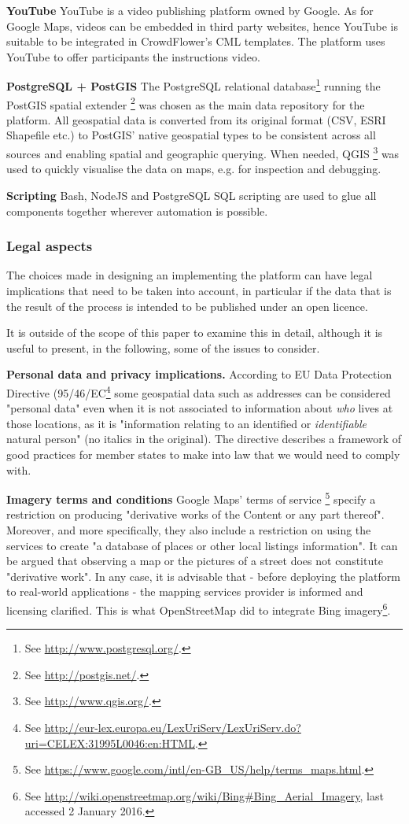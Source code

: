 \textbf{YouTube} YouTube is a video publishing platform owned by Google. As for Google Maps, videos can be embedded in third party websites, hence YouTube is suitable to be integrated in CrowdFlower's CML templates. The platform uses YouTube to offer participants the instructions video.  

\textbf{PostgreSQL + PostGIS} The PostgreSQL relational database\footnote{See \url{http://www.postgresql.org/}.} running the PostGIS spatial extender \footnote{See \url{http://postgis.net/}.} was chosen as the main data repository for the platform. All geospatial data is converted from its original format (CSV, ESRI Shapefile etc.) to PostGIS' native geospatial types to be consistent across all sources and enabling spatial and geographic querying. When needed, QGIS \footnote{See \url{http://www.qgis.org/}.} was used to quickly visualise the data on maps, e.g. for inspection and debugging.

\textbf{Scripting} Bash, NodeJS and PostgreSQL SQL scripting are used to glue all components together wherever automation is possible.  

\subsubsection{Legal aspects}

The choices made in designing an implementing the platform can have legal implications that need to be taken into account, in particular if the data that is the result of the process is intended to be published under an open licence.

It is outside of the scope of this paper to examine this in detail, although it is useful to present, in the following, some of the issues to consider.

\textbf{Personal data and privacy implications.} According to EU Data Protection Directive (95/46/EC\footnote{See \url{http://eur-lex.europa.eu/LexUriServ/LexUriServ.do?uri=CELEX:31995L0046:en:HTML}.} some geospatial data such as addresses can be considered "personal data" even when it is not associated to information about {\it who} lives at those locations, as it is "information relating to an identified or {\it identifiable} natural person" (no italics in the original). The directive describes a framework of good practices for member states to make into law that we would need to comply with.
	
\textbf{Imagery terms and conditions} Google Maps' terms of service \footnote{See \url{https://www.google.com/intl/en-GB_US/help/terms_maps.html}.} specify a restriction on producing "derivative works of the Content or any part thereof". Moreover, and more specifically, they also include a restriction on using the services to create "a database of places or other local listings information". It can be argued that observing a map or the pictures of a street does not constitute "derivative work". In any case, it is advisable that - before deploying the platform to real-world applications - the mapping services provider is informed and licensing clarified. This is what OpenStreetMap did to integrate Bing imagery\footnote{See \url{http://wiki.openstreetmap.org/wiki/Bing#Bing_Aerial_Imagery}, last accessed 2 January 2016.}.

